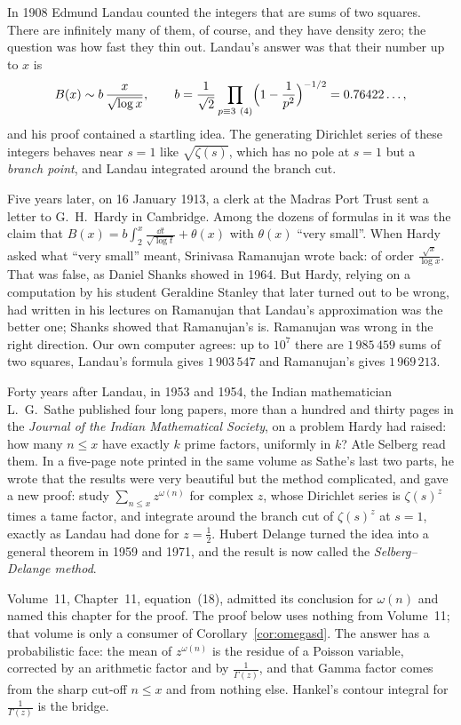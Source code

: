 In 1908 Edmund Landau counted the integers that are sums of two squares. There are infinitely many of them, of course, and they have density zero; the question was how fast they thin out. Landau's answer was that their number up to $x$ is
\[
B(x)\sim b\,\frac x{\sqrt{\log x}},\qquad b=\frac1{\sqrt2}\prod_{p\equiv3\ (4)}\Bigl(1-\frac1{p^2}\Bigr)^{-1/2}=0.76422\ldots,
\]
and his proof contained a startling idea. The generating Dirichlet series of these integers behaves near $s=1$ like $\sqrt{\zeta(s)}$, which has no pole at $s=1$ but a \emph{branch point}, and Landau integrated around the branch cut.

Five years later, on 16 January 1913, a clerk at the Madras Port Trust sent a letter to G.~H.~Hardy in Cambridge. Among the dozens of formulas in it was the claim that $B(x)=b\int_2^x\frac{\dd t}{\sqrt{\log t}}+\theta(x)$ with $\theta(x)$ ``very small''. When Hardy asked what ``very small'' meant, Srinivasa Ramanujan wrote back: of order $\frac{\sqrt x}{\log x}$. That was false, as Daniel Shanks showed in 1964. But Hardy, relying on a computation by his student Geraldine Stanley that later turned out to be wrong, had written in his lectures on Ramanujan that Landau's approximation was the better one; Shanks showed that Ramanujan's is. Ramanujan was wrong in the right direction. Our own computer agrees: up to $10^7$ there are $1\,985\,459$ sums of two squares, Landau's formula gives $1\,903\,547$ and Ramanujan's gives $1\,969\,213$.

Forty years after Landau, in 1953 and 1954, the Indian mathematician L.~G.~Sathe published four long papers, more than a hundred and thirty pages in the \emph{Journal of the Indian Mathematical Society}, on a problem Hardy had raised: how many $n\le x$ have exactly $k$ prime factors, uniformly in $k$? Atle Selberg read them. In a five-page note printed in the same volume as Sathe's last two parts, he wrote that the results were very beautiful but the method complicated, and gave a new proof: study $\sum_{n\le x}z^{\omega(n)}$ for complex $z$, whose Dirichlet series is $\zeta(s)^z$ times a tame factor, and integrate around the branch cut of $\zeta(s)^z$ at $s=1$, exactly as Landau had done for $z=\frac12$. Hubert Delange turned the idea into a general theorem in 1959 and 1971, and the result is now called the \emph{Selberg--Delange method}.

Volume~11, Chapter~11, equation~(18), admitted its conclusion for $\omega(n)$ and named this chapter for the proof. The proof below uses nothing from Volume~11; that volume is only a consumer of Corollary~\ref{cor:omegasd}. The answer has a probabilistic face: the mean of $z^{\omega(n)}$ is the residue of a Poisson variable, corrected by an arithmetic factor and by $\frac1{\Gamma(z)}$, and that Gamma factor comes from the sharp cut-off $n\le x$ and from nothing else. Hankel's contour integral for $\frac1{\Gamma(z)}$ is the bridge.

